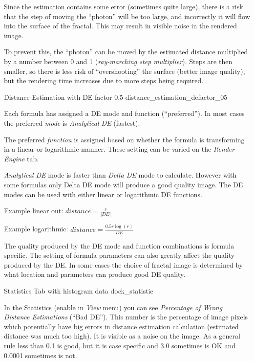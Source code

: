 Since the estimation contains some error (sometimes quite large), there is a
risk that the step of moving the ``photon'' will be too large, and incorrectly it
will flow into the surface of the fractal. This may result in visible noise in
the rendered image.

To prevent this, the ``photon'' can be moved by the estimated distance multiplied
by a number between 0 and 1 (\emph{ray-marching step multiplier}). Steps are then
smaller, so there is less risk of ``overshooting'' the surface (better image quality), but the rendering
time increases due to more steps being required.

\nopagebreak

{Distance Estimation with DE factor 0.5}
{distance_estimation_defactor_05}

Each formula has assigned a DE mode and function (``preferred''). In most cases
the preferred \emph{mode} is \emph{Analytical DE} (fastest).

The preferred \emph{function} is assigned based on whether the formula is
transforming in a linear or logarithmic manner. These setting can be varied on
the \emph{Render Engine} tab.

\emph{Analytical DE} mode is faster than \emph{Delta DE} mode to calculate.
However with some formulas only Delta DE mode will produce a good quality image.
The DE modes can be used with either linear or logarithmic DE functions.

Example linear out: $ distance = \frac{r}{\lvert DE \rvert} $

Example logarithmic: $ distance = \frac{0.5 r  \log(r)}{DE} $

The quality produced by the DE mode and function combinations is formula
specific. The setting of formula parameters can also greatly affect the quality
produced by the DE. In some cases the choice of fractal image is determined by
what location and parameters can produce good DE quality.

\nopagebreak

{Statistics Tab with histogram data}
{dock_statistic}

In the Statistics (enable in \emph{View} menu) you can see \emph{Percentage of
	Wrong Distance Estimations} (``Bad DE''). This number is the percentage of image
pixels which potentially have big errors in distance estimation calculation
(estimated distance was much too high). It is visible as a noise on the image.
As a general rule less than 0.1 is good, but it is case specific and 3.0
sometimes is OK and 0.0001 sometimes is not.
